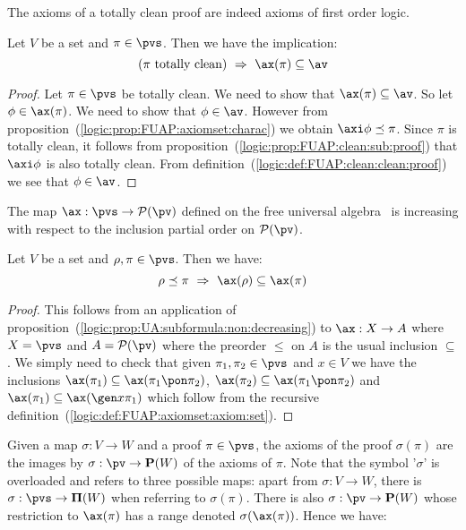 The axioms of a totally clean proof are indeed axioms of first order
logic.
\begin{prop}\label{logic:prop:FUAP:axiomset:clean:proof}
Let $V$ be a set and $\pi\in\pvs$. Then we have the implication:
    \[
    (\mbox{$\pi$ totally clean})\ \Rightarrow\ \ax(\pi)\subseteq\av
    \]
\end{prop}
\begin{proof}
Let $\pi\in\pvs$ be totally clean. We need to show that
$\ax(\pi)\subseteq\av$. So let $\phi\in\ax(\pi)$. We need to show
that $\phi\in\av$. However from
proposition~(\ref{logic:prop:FUAP:axiomset:charac}) we obtain
$\axi\phi\preceq\pi$. Since $\pi$ is totally clean, it follows from
proposition~(\ref{logic:prop:FUAP:clean:sub:proof}) that $\axi\phi$
is also totally clean. From
definition~(\ref{logic:def:FUAP:clean:clean:proof}) we see that
$\phi\in\av$.
\end{proof}

The map $\ax:\pvs\to{\cal P}(\pv)$ defined on the free universal
algebra \pvs\ is increasing with respect to the inclusion partial
order on ${\cal P}(\pv)$.

\begin{prop}\label{logic:prop:FUAP:axiomset:subformula}
Let $V$ be a set and $\rho,\pi\in\pvs$. Then we have:
    \[
    \rho\preceq\pi\ \Rightarrow\ \ax(\rho)\subseteq\ax(\pi)
    \]
\end{prop}
\begin{proof}
This follows from an application of
proposition~(\ref{logic:prop:UA:subformula:non:decreasing}) to
$\ax:X\to A$ where $X=\pvs$ and $A={\cal P}(\pv)$ where the preorder
$\leq$ on $A$ is the usual inclusion $\subseteq$. We simply need to
check that given $\pi_{1},\pi_{2}\in\pvs$ and $x\in V$ we have the
inclusions $\ax(\pi_{1})\subseteq\ax(\pi_{1}\pon\pi_{2})$,
$\ax(\pi_{2})\subseteq\ax(\pi_{1}\pon\pi_{2})$ and
$\ax(\pi_{1})\subseteq\ax(\gen x\pi_{1})$ which follow from the
recursive definition~(\ref{logic:def:FUAP:axiomset:axiom:set}).
\end{proof}

Given a map $\sigma:V\to W$ and a proof $\pi\in\pvs$, the axioms of
the proof $\sigma(\pi)$ are the images by $\sigma:\pv\to{\bf P}(W)$
of the axioms of $\pi$. Note that the symbol '$\sigma$' is
overloaded and refers to three possible maps: apart from
$\sigma:V\to W$, there is $\sigma:\pvs\to{\bf\Pi}(W)$ when referring
to $\sigma(\pi)$. There is also $\sigma:\pv\to{\bf P}(W)$ whose
restriction to $\ax(\pi)$ has a range denoted $\sigma(\ax(\pi))$.
Hence we have:

